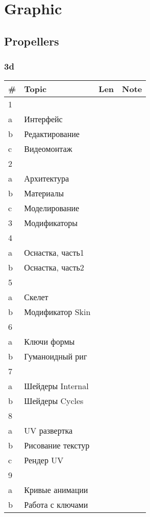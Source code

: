 \documentclass[a4paper,12pt]{article} %
\begin{document}
\newpage
\section{Graphic}
\subsection{Propellers}
\subsubsection{3d}
\begin{longtable}{|l|p{11cm}|l|l|}
	\hline
	\# & Topic & Len & Note \\
	\hline
	1 &  &  &  \\
	a & Интерфейс &  &  \\
	b & Редактирование &  &  \\
	c & Видеомонтаж &  &  \\
	\hline
	2 &  &  &  \\
	a & Архитектура &  &  \\
	b & Материалы &  &  \\
	c & Моделирование &  &  \\
	\hline
	3 & Модификаторы &  &  \\
	\hline
	4 &  &  &  \\
	a & Оснастка, часть1 &  &  \\
	b & Оснастка, часть2 &  &  \\
	\hline
	5 &  &  &  \\
	a & Скелет &  &  \\
	b & Модификатор Skin &  &  \\
	\hline
	6 &  &  &  \\
	a & Ключи формы &  &  \\
	b & Гуманоидный риг &  &  \\
	\hline
	7 &  &  &  \\
	a & Шейдеры Internal &  &  \\
	b & Шейдеры Cycles &  &  \\
	\hline
	8 &  &  &  \\
	a & UV развертка &  &  \\
	b & Рисование текстур &  &  \\
	c & Рендер UV &  &  \\
	\hline
	9 &  &  &  \\
	a & Кривые анимации &  &  \\
	b & Работа с ключами &  &  \\

\end{longtable}
\end{document}
